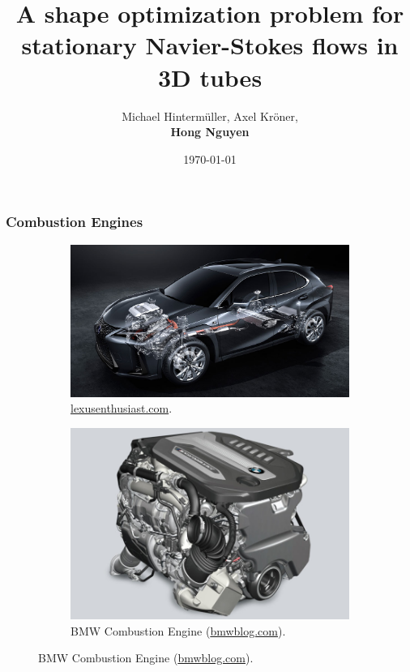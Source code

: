 \documentclass[10pt,xcolor=table,english]{beamer}   %
\begin{document}
\title{A shape optimization problem for stationary Navier-Stokes flows in 3D tubes}
\author{Michael Hinterm\"uller, Axel Kr\"oner,\\ \textbf{Hong Nguyen}}
\date{\today}

\wiasTitleSlide

\begin{frame}
    \frametitle{Combustion Engines}
    \begin{figure}
        \begin{subfigure}{.49\textwidth}
            \centering
            \includegraphics[width=.8\linewidth]{Combustion_Engine_in_Car}  
            \caption{\href{https://lexusenthusiast.com/2018/04/24/internal-combustion-engines-remain-priority-at-toyota/}{lexusenthusiast.com}.}
            \label{fig:sub-first}
        \end{subfigure}
        \begin{subfigure}{.49\textwidth}
            \centering
            \includegraphics[width=.8\linewidth]{BMW_Combustion_Engine}  
            \caption{BMW Combustion Engine (\href{https://www.bmwblog.com/2019/06/27/bmw-sees-internal-combustion-engines-still-going-for-a-couple-decades/}{bmwblog.com}).}
            \label{fig:sub-third}
        \end{subfigure}
    

\end{figure}
\end{frame}
\end{document}

